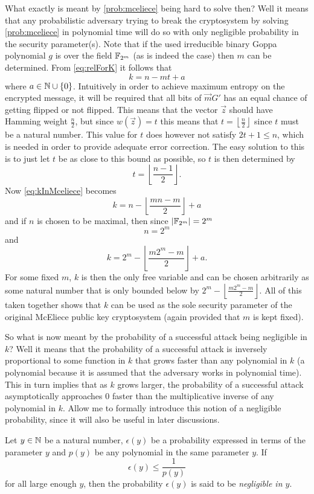 What exactly is meant by \cref{prob:mceliece} being hard to solve then? Well it means that any probabilistic adversary trying to break the cryptosystem by solving \cref{prob:mceliece} in polynomial time will do so with only negligible probability in the security parameter(s). Note that if the used irreducible binary Goppa polynomial $g$ is over the field $\mathbb{F}_{2^m}$ (as is indeed the case) then $m$ can be determined. From \cref{eq:relForK} it follows that
\begin{equation}
\label{eq:kInMceliece}	
	k = n-mt+a
\end{equation}
where $a \in \mathbb{N} \cup \left\{ 0 \right\}$. Intuitively in order to achieve maximum entropy on the encrypted message, it will be required that all bits of $\vec{m}G'$ has an equal chance of getting flipped or not flipped. This means that the vector $\vec{z}$ should have Hamming weight $\frac{n}{2}$, but since $w\left(\vec{z}\right) = t$ this means that $t = \left\lfloor \frac{n}{2} \right\rfloor$ since $t$ must be a natural number. This value for $t$ does however not satisfy $2t + 1 \leq n$, which is needed in order to provide adequate error correction. The easy solution to this is to just let $t$ be as close to this bound as possible, so $t$ is then determined by
\begin{equation}
\label{eq:tInMceliece}
	t = \left\lfloor \frac{n-1}{2} \right\rfloor .
\end{equation}
Now \cref{eq:kInMceliece} becomes
\[
	k = n - \left\lfloor \frac{mn-m}{2} \right\rfloor + a
\]
and if $n$ is chosen to be maximal, then since $\left\vert \mathbb{F}_{2^m} \right\vert = 2^m$
\[
	n = 2^m
\]
and
\[
	k = 2^m - \left\lfloor \frac{m 2^m - m}{2} \right\rfloor + a.
\]
For some fixed $m$, $k$ is then the only free variable and can be chosen arbitrarily as some natural number that is only bounded below by $2^m - \left\lfloor \frac{m 2^m - m}{2} \right\rfloor$. All of this taken together shows that $k$ can be used as the sole security parameter of the original McEliece public key cryptosystem (again provided that $m$ is kept fixed).

So what is now meant by the probability of a successful attack being negligible in $k$? Well it means that the probability of a successful attack is inversely proportional to some function in $k$ that grows faster than any polynomial in $k$ (a polynomial because it is assumed that the adversary works in polynomial time). This in turn implies that as $k$ grows larger, the probability of a successful attack asymptotically approaches $0$ faster than the multiplicative inverse of any polynomial in $k$. Allow me to formally introduce this notion of a negligible probability, since it will also be useful in later discussions.
\begin{defi}
\label{def:negProb}
	Let $y \in \mathbb{N}$ be a natural number, $\epsilon\left(y\right)$ be a probability expressed in terms of the parameter $y$ and $p\left(y\right)$ be any polynomial in the same parameter $y$. If
	\[
		\epsilon\left(y\right) \leq \frac{1}{p\left(y\right)}
	\]
	for all large enough $y$, then the probability $\epsilon\left(y\right)$ is said to be \emph{negligible in $y$}.
\end{defi}

